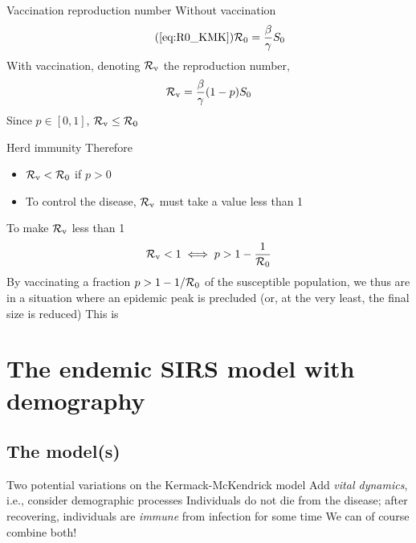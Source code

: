 \documentclass[aspectratio=169]{beamer}\usepackage[]{graphicx}\usepackage[]{xcolor}
\begin{document}
\begin{frame}{Vaccination reproduction number}
  Without vaccination
  \begin{equation}\tag{\ref{eq:R0_KMK}}
    \R_0=\frac{\beta}{\gamma}S_0
  \end{equation}
  \vfill
  With vaccination, denoting $\mathcal{R}_{\text{v}}$ the reproduction number,
  \begin{equation}
    \mathcal{R}_{\text{v}} = \frac{\beta}{\gamma}(1-p)S_0
  \end{equation}
  \vfill
  Since $p\in[0,1]$, $\mathcal{R}_{\text{v}}\leq\mathcal{R}_0$
\end{frame}


\begin{frame}{Herd immunity}
  Therefore
  \begin{itemize}
    \item $\mathcal{R}_{\text{v}}<\mathcal{R}_0$ if $p>0$ 
    \item To control the disease, $\mathcal{R}_{\text{v}}$ must take a value less than 1
  \end{itemize}
  \vfill
To make $\mathcal{R}_{\text{v}}$ less than 1
  \begin{equation}\label{eq:herd_immunity}
    \mathcal{R}_{\text{v}}<1 \iff p> 1-\frac{1}{\mathcal{R}_0}
  \end{equation}
  \vfill
  By vaccinating a fraction $p>1-1/\mathcal{R}_0$ of the susceptible population, we thus are in a situation where an epidemic peak is precluded (or, at the very least, the final size is reduced)
  \vfill
  This is 
\end{frame}







\section{The endemic SIRS model with demography}

\subsection{The model(s)}
\begin{frame}{Two potential variations on the Kermack-McKendrick model}
\bbullet Add \emph{vital dynamics}, i.e., consider demographic processes
\vfill
\bbullet Individuals do not die from the disease; after recovering, individuals are \emph{immune} from infection for some time
\vfill
\bbullet We can of course combine both!
\end{frame}
\end{document}
